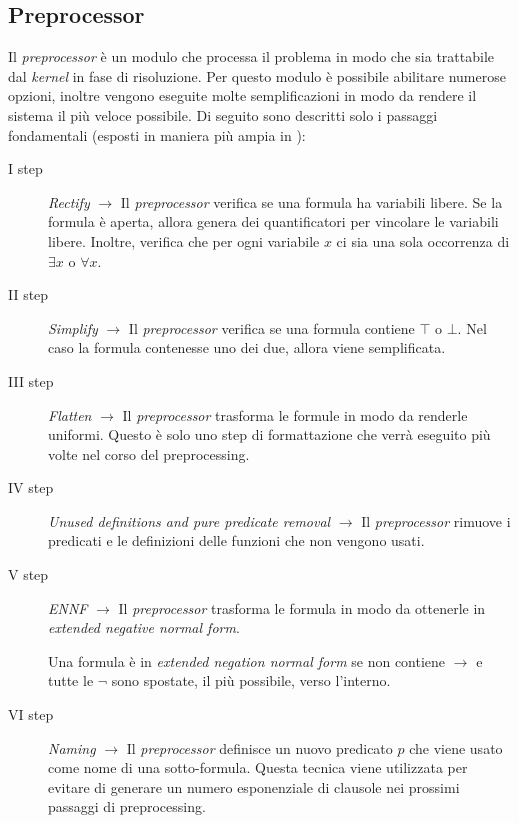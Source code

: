 \subsection{Preprocessor}
Il \emph{\emph{preprocessor}} è un modulo che processa il problema in modo che sia trattabile dal \emph{kernel} in fase di risoluzione.
Per questo modulo è possibile abilitare numerose opzioni, inoltre vengono eseguite molte semplificazioni in modo da rendere il sistema il 
più veloce possibile. Di seguito sono descritti solo i passaggi fondamentali (esposti in maniera più ampia in \cite{reger2016new}): 
\begin{description}
    \item[I step] \emph{Rectify} $\longrightarrow$ Il \emph{preprocessor} verifica se una formula ha variabili libere. Se la formula è aperta, 
    allora genera dei quantificatori per vincolare le variabili libere. Inoltre, verifica che per ogni variabile $x$ ci sia una sola occorrenza di $\exists x$ o $\forall x$. 
    \item[II step] \emph{Simplify} $\longrightarrow$ Il \emph{preprocessor} verifica se una formula contiene $\top$ o $\bot$. Nel caso la formula contenesse uno dei due, allora
    viene semplificata.
    \item[III step] \emph{Flatten} $\longrightarrow$ Il \emph{preprocessor} trasforma le formule in modo da renderle uniformi. Questo è solo uno step di formattazione che verrà eseguito più volte nel corso del preprocessing.
    \item[IV step] \emph{Unused definitions and pure predicate removal} $\longrightarrow$ Il \emph{preprocessor} rimuove i predicati e le definizioni delle funzioni che non vengono usati.
    \item[V step] \emph{ENNF} $\longrightarrow$ Il \emph{preprocessor} trasforma le formula in modo da ottenerle in \emph{extended negative normal form}.
    \begin{definition}
        Una formula è in \emph{extended negation normal form} se non contiene $\rightarrow$ e tutte le $\neg$ sono spostate, il più possibile, verso l'interno.  
    \end{definition}
    \item[VI step] \emph{Naming} $\longrightarrow$ Il \emph{preprocessor} definisce un nuovo predicato $p$ che viene usato come nome di una sotto-formula. 
    Questa tecnica viene utilizzata per evitare di generare un numero esponenziale di clausole nei prossimi passaggi di preprocessing.
    \begin{definition}

\end{definition}
\end{description}
